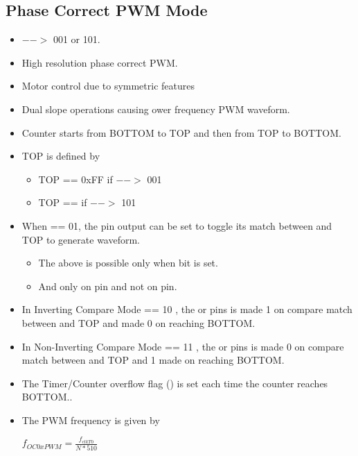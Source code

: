 \subsection{Phase Correct PWM Mode}
\begin{itemize}
    \item {} $-->$ 001 or 101.
    \item High resolution phase correct PWM.
    \item Motor control due to symmetric features
    \item Dual slope operations causing ower frequency PWM waveform.
    \item Counter starts from BOTTOM to TOP and then from TOP to BOTTOM.
    \item TOP is defined by
    \begin{itemize}
        \item TOP == 0xFF if  $-->$ 001
        \item TOP ==  if  $-->$ 101
    \end{itemize}
    \item  When  == 01, the  pin output can be set to toggle its match between  and TOP to generate waveform.
    \begin{itemize}
        \item The above is possible only when  bit is set.
        \item And only on  pin and not on  pin.
    \end{itemize}
    \item In Inverting Compare Mode  == 10 , the  or  pins is made 1 on compare match between  and TOP and made 0 on reaching BOTTOM.
    \item In Non-Inverting Compare Mode  == 11 , the  or  pins is made 0 on compare match between  and TOP and 1 made  on reaching BOTTOM.
    \item The Timer/Counter overflow flag () is set each time the counter reaches BOTTOM..
    \item The PWM frequency is given by 
    \begin{center}
        { \Large $f_{OC0xPWM} = \frac{f_{clkT0}}{N * 510}$ }
    \end{center}
\end{itemize}

